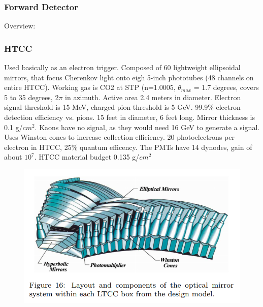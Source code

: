     \subsubsection{Forward Detector}
        Overview:
        \subsubsection{HTCC}
            Used basically as an electron trigger. Composed of 60 lightweight ellipsoidal mirrors, that focus Cherenkov light onto eigh 5-inch phototubes (48 channels on entire HTCC). Working gas is CO2 at STP (n=1.0005, $\theta_{max}$ = 1.7 degrees, covers 5 to 35 degrees, 2$\pi$ in azimuth. Active area 2.4 meters in diameter. Electron signal threshold is 15 MeV, charged pion threshold is 5 GeV. 99.9\% electron detection efficiency vs. pions. 15 feet in diameter, 6 feet long. Mirror thickness is 0.1 g/$cm^2$. Kaons have no signal, as they would need 16 GeV to generate a signal. Uses Winston cones to increase collection efficiency. 20 photoelectrons per electron in HTCC, 25\% quantum efficency. The PMTs have 14 dynodes, gain of about $10^7$. HTCC material budget 0.135 g/$cm^2$
            
            									
			 \begin{figure}[H]
    			\centering
    			\includegraphics[width=12cm]{Chapters/Ch2-Experiment/clas-12-system/pics/fd/htcc-mirrors.PNG}
			\end{figure}
			
						
									
